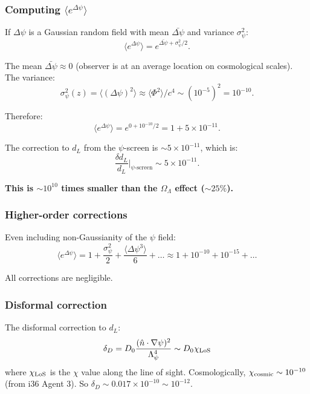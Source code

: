 \documentclass[11pt,a4paper]{article}
\begin{document}
\subsubsection{Computing $\langle e^{\Delta\psi}\rangle$}

If $\Delta\psi$ is a Gaussian random field with mean $\bar{\Delta\psi}$ and variance $\sigma_\psi^2$:
\begin{equation}
\langle e^{\Delta\psi}\rangle = e^{\bar{\Delta\psi} + \sigma_\psi^2/2}.
\end{equation}

The mean $\bar{\Delta\psi} \approx 0$ (observer is at an average location on cosmological scales). The variance:
\begin{equation}
\sigma_\psi^2(z) = \langle(\Delta\psi)^2\rangle \approx \langle\Phi^2\rangle/c^4 \sim (10^{-5})^2 = 10^{-10}.
\end{equation}

Therefore:
\begin{equation}
\langle e^{\Delta\psi}\rangle = e^{0 + 10^{-10}/2} = 1 + 5 \times 10^{-11}.
\end{equation}

The correction to $d_L$ from the $\psi$-screen is $\sim 5 \times 10^{-11}$, which is:
\begin{equation}
\frac{\delta d_L}{d_L}\bigg|_{\psi\text{-screen}} \sim 5 \times 10^{-11}.
\end{equation}

\textbf{This is $\sim 10^{10}$ times smaller than the $\Omega_\Lambda$ effect ($\sim 25\%$).}

\subsubsection{Higher-order corrections}

Even including non-Gaussianity of the $\psi$ field:
\begin{equation}
\langle e^{\Delta\psi}\rangle = 1 + \frac{\sigma_\psi^2}{2} + \frac{\langle\Delta\psi^3\rangle}{6} + \ldots \approx 1 + 10^{-10} + 10^{-15} + \ldots
\end{equation}

All corrections are negligible.

\subsubsection{Disformal correction}

The disformal correction to $d_L$:
\begin{equation}
\delta_D = D_0 \frac{(\hat{n}\cdot\nabla\psi)^2}{\Lambda_\psi^4} \sim D_0 \chi_{\rm LoS}
\end{equation}
where $\chi_{\rm LoS}$ is the $\chi$ value along the line of sight. Cosmologically, $\chi_{\rm cosmic} \sim 10^{-10}$ (from i36 Agent 3). So $\delta_D \sim 0.017 \times 10^{-10} \sim 10^{-12}$.
\end{document}
